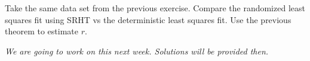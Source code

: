 \documentclass[11pt]{article}
\begin{document}
Take the same data set from the previous exercise. Compare the randomized least squares fit using SRHT vs the deterministic least squares fit. Use the previous theorem to estimate $r$. 

\textit{We are going to work on this next week. Solutions will be provided then.}



\end{document}
